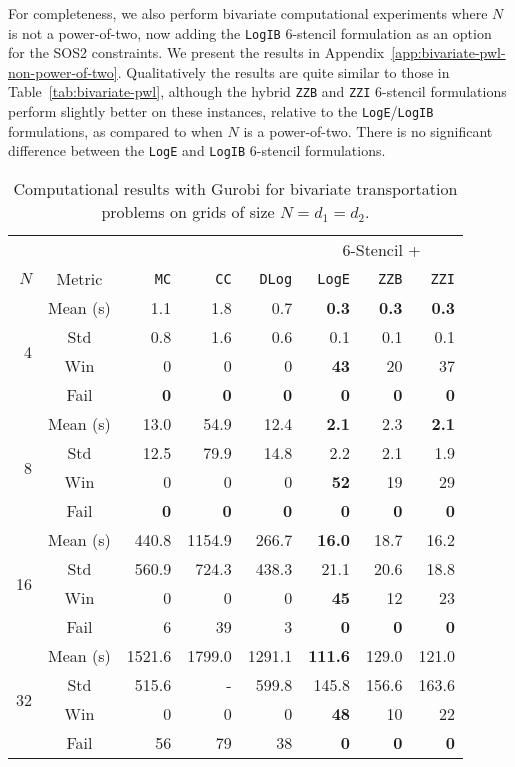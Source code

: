 \documentclass[opre,nonblindrev]{informs3} %
\newcommand{\blue}[1]{{#1}}
\newcommand{\ZZB}{\texttt{ZZB}}
\newcommand{\ZZI}{\texttt{ZZI}}
\newcommand{\Log}{\texttt{LogE}}
\newcommand{\LogIB}{\texttt{LogIB}}
\begin{document}
For completeness, we also perform bivariate computational experiments where $N$ is not a power-of-two, now adding the \LogIB{} 6-stencil formulation as an option for the SOS2 constraints. We present the results in Appendix~\ref{app:bivariate-pwl-non-power-of-two}. Qualitatively the results are quite similar to those in Table~\ref{tab:bivariate-pwl}, although the hybrid \ZZB{} and \ZZI{} 6-stencil formulations perform slightly better on these instances, relative to the \Log{}/\LogIB{} formulations, as compared to when $N$ is a power-of-two. There is no significant difference between the \Log{} and \LogIB{} 6-stencil formulations.

\blue{
\begin{table}[htpb]
         \centering
         \smaller
         \begin{tabular}{r|c|rrr:rrr}
             \multicolumn{5}{c}{} & \multicolumn{3}{c}{6-Stencil +} \\
     $N$ & Metric & \texttt{MC} & \texttt{CC} & \texttt{DLog} & \Log{} & \texttt{ZZB} & \texttt{ZZI} \\ \hline
\multirow{4}{*}{4}
 & Mean (s)  & 1.1  & 1.8  & 0.7  & \textbf{0.3}  & \textbf{0.3}  & \textbf{0.3}  \\
 & Std  & 0.8  & 1.6  & 0.6  & 0.1 & 0.1 & 0.1 \\
 & Win & 0 & 0 & 0 & \textbf{43} & 20 & 37  \\
 & Fail & \textbf{0} & \textbf{0} & \textbf{0} & \textbf{0} & \textbf{0} & \textbf{0}  \\
\hline
\multirow{4}{*}{8}
 & Mean (s)  & 13.0  & 54.9  & 12.4  & \textbf{2.1}  & 2.3  & \textbf{2.1}  \\
 & Std  & 12.5  & 79.9  & 14.8  & 2.2  & 2.1  & 1.9 \\
 & Win & 0 & 0 & 0 & \textbf{52} & 19 & 29  \\
 & Fail & \textbf{0} & \textbf{0} & \textbf{0} & \textbf{0} & \textbf{0} & \textbf{0}  \\
\hline
\multirow{4}{*}{16}
 & Mean (s)  & 440.8  & 1154.9  & 266.7  & \textbf{16.0}  & 18.7  & 16.2  \\
 & Std  & 560.9  & 724.3  & 438.3  & 21.1  & 20.6  & 18.8 \\
 & Win & 0 & 0 & 0 & \textbf{45} & 12 & 23  \\
 & Fail & 6 & 39 & 3 & \textbf{0} & \textbf{0} & \textbf{0}  \\
\hline
\multirow{4}{*}{32}
 & Mean (s)  & 1521.6  & 1799.0  & 1291.1  & \textbf{111.6}  & 129.0  & 121.0  \\
 & Std  & 515.6  & - & 599.8  & 145.8 & 156.6  & 163.6  \\
 & Win & 0 & 0 & 0 & \textbf{48} & 10 & 22  \\
 & Fail & 56 & 79 & 38 & \textbf{0} & \textbf{0} & \textbf{0}
         \end{tabular}
         \caption{Computational results with Gurobi for bivariate transportation problems on grids of size $N=d_1=d_2$.}
         \label{tab:bivariate-gurobi}
\end{table}

}
\end{document}
